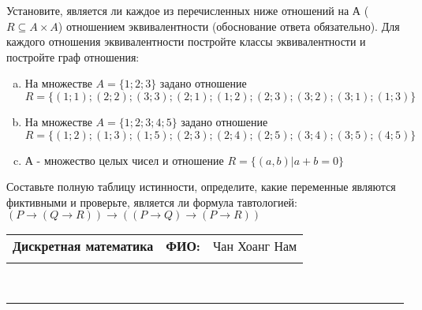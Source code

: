 \documentclass[10pt]{exam}
\newcommand{\class}{Дискретная математика}
\newcommand{\examdate}{}
\begin{document}
\begin{questions}
\question
Установите, является ли каждое из перечисленных ниже отношений на А ($R \subseteq A \times A$) отношением эквивалентности (обоснование ответа обязательно). Для каждого отношения эквивалентности постройте классы 
эквивалентности и постройте граф отношения:
\begin{enumerate} [a)]\setcounter{enumi}{0}
\item На множестве $A = \{1; 2; 3\}$ задано отношение $R = \{(1; 1); (2; 2); (3; 3); (2; 1); (1; 2); (2; 3); (3; 2); (3; 1); (1; 3)\}$
\item На множестве $A = \{1; 2; 3; 4; 5\}$ задано отношение $R = \{(1; 2); (1; 3); (1; 5); (2; 3); (2; 4); (2; 5); (3; 4); (3; 5); (4; 5)\}$
\item А - множество целых чисел и отношение $R = \{(a,b)|a + b = 0\}$
\end{enumerate}\question Составьте полную таблицу истинности, определите, какие переменные являются фиктивными и проверьте, является ли формула тавтологией:
$(P \rightarrow (Q \rightarrow R)) \rightarrow ((P \rightarrow Q) \rightarrow (P \rightarrow R))$

\end{questions}
\newpage
\begin{flushright}
\begin{tabular}{p{2.8in} r l}
\textbf{\class} & \textbf{ФИО:} &Чан Хоанг Нам
\\

\textbf{\examdate} &&\\
\end{tabular}\\
\end{flushright}
\rule[1ex]{\textwidth}{.1pt}
\end{document}
